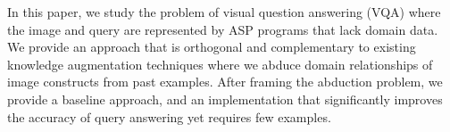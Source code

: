 In this paper, we study the problem of visual question answering (VQA) where the image and query are represented by ASP programs that lack domain data.  We provide an approach that is orthogonal and complementary to existing knowledge augmentation techniques where we abduce domain relationships of image constructs from past examples.
After framing the abduction problem, we provide a baseline approach, and an implementation that significantly improves the accuracy of query answering yet requires few examples.
